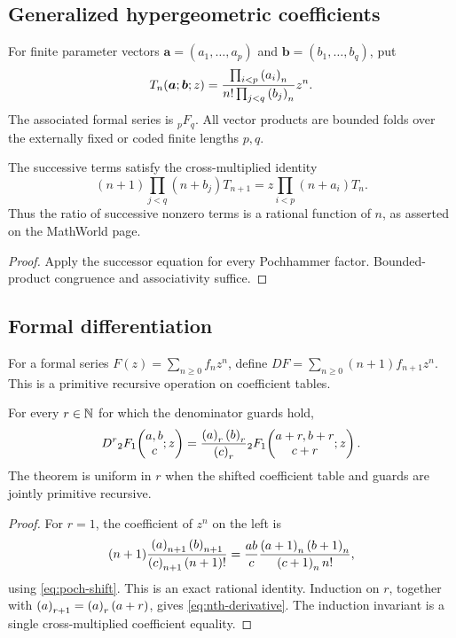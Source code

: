 \subsection{Generalized hypergeometric coefficients}

\begin{definition}\label{def:pfq}
For finite parameter vectors
\(\boldsymbol a=(a_1,\ldots,a_p)\) and
\(\boldsymbol b=(b_1,\ldots,b_q)\), put
\[
 T_n(\boldsymbol a;\boldsymbol b;z)
  =\frac{\prod_{i<p}\left(a_i\right)_{n}}
         {n!\prod_{j<q}\left(b_j\right)_{n}}z^n.
\]
The associated formal series is \({}_pF_q\).  All vector products are bounded
folds over the externally fixed or coded finite lengths \(p,q\).
\end{definition}

\begin{proposition}\label{prop:pfq-ratio}
The successive terms satisfy the cross-multiplied identity
\[
 (n+1)\prod_{j<q}(n+b_j)T_{n+1}
 =z\prod_{i<p}(n+a_i)T_n.
\]
Thus the ratio of successive nonzero terms is a rational function of \(n\),
as asserted on the MathWorld page.
\end{proposition}

\begin{proof}
Apply the successor equation for every Pochhammer factor.  Bounded-product
congruence and associativity suffice.
\end{proof}

\subsection{Formal differentiation}

For a formal series \(F(z)=\sum_{n\ge0}f_nz^n\), define
\(DF=\sum_{n\ge0}(n+1)f_{n+1}z^n\).  This is a primitive recursive operation
on coefficient tables.

\begin{theorem}\label{thm:derivatives}
For every \(r\in\mathbb N\) for which the denominator guards hold,
\begin{equation}\label{eq:nth-derivative}
 D^r{}_2F_1\!\left(\begin{matrix}a,b\\c\end{matrix};z\right)
 =\frac{\left(a\right)_{r}\left(b\right)_{r}}{\left(c\right)_{r}}
   {}_2F_1\!\left(\begin{matrix}a+r,b+r\\c+r\end{matrix};z\right).
\end{equation}
The theorem is uniform in \(r\) when the shifted coefficient table and guards
are jointly primitive recursive.
\end{theorem}

\begin{proof}
For \(r=1\), the coefficient of \(z^n\) on the left is
\[
 (n+1)\frac{\left(a\right)_{n+1}\left(b\right)_{n+1}}
                   {\left(c\right)_{n+1}(n+1)!}
 =\frac{ab}{c}\frac{\left(a+1\right)_{n}\left(b+1\right)_{n}}
                         {\left(c+1\right)_{n} n!},
\]
using \eqref{eq:poch-shift}.  This is an exact rational identity.  Induction
on \(r\), together with
\(\left(a\right)_{r+1}=\left(a\right)_{r}(a+r)\), gives
\eqref{eq:nth-derivative}.  The induction invariant is a single
cross-multiplied coefficient equality.
\end{proof}

